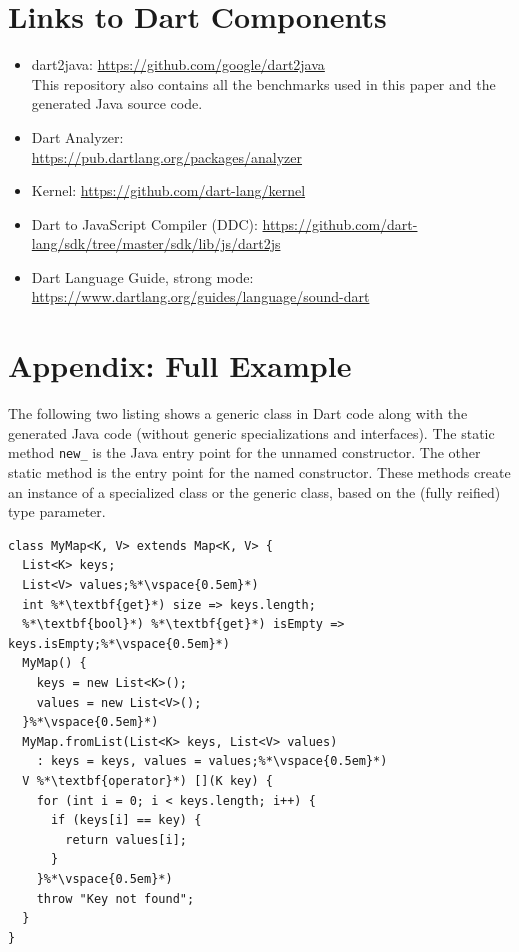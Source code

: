 \documentclass[sigplan]{acmart}
\begin{document}
\section{Links to Dart Components}
\begin{itemize}
  \item dart2java: \url{https://github.com/google/dart2java} \\
    This repository also contains all the benchmarks used in this paper and the generated Java source code.
  \item Dart Analyzer:\\ \url{https://pub.dartlang.org/packages/analyzer}
    \item Kernel: \url{https://github.com/dart-lang/kernel}
    \item Dart to JavaScript Compiler (DDC): \url{https://github.com/dart-lang/sdk/tree/master/sdk/lib/js/dart2js}
    \item Dart Language Guide, strong mode: \\ \url{https://www.dartlang.org/guides/language/sound-dart}
\end{itemize}



\section{Appendix: Full Example}
The following two listing shows a generic class in Dart code along with the generated Java code (without generic specializations and interfaces). The static method \texttt{new\_} is the Java entry point for the unnamed constructor. The other static method is the entry point for the named constructor. These methods create an instance of a specialized class or the generic class, based on the (fully reified) type parameter.

\vfill\eject

\begin{mdframed}[outerlinewidth=0.1pt,outerlinecolor=black,skipabove=4pt,
  innerleftmargin=5pt,innerrightmargin=0pt,innertopmargin=0pt,innerbottommargin=0pt]
\begin{lstlisting}[basicstyle=\scriptsize\ttfamily]
class MyMap<K, V> extends Map<K, V> {
  List<K> keys;
  List<V> values;%*\vspace{0.5em}*)
  int %*\textbf{get}*) size => keys.length;
  %*\textbf{bool}*) %*\textbf{get}*) isEmpty => keys.isEmpty;%*\vspace{0.5em}*)
  MyMap() {
    keys = new List<K>();
    values = new List<V>();
  }%*\vspace{0.5em}*)
  MyMap.fromList(List<K> keys, List<V> values) 
    : keys = keys, values = values;%*\vspace{0.5em}*)
  V %*\textbf{operator}*) [](K key) {
    for (int i = 0; i < keys.length; i++) {
      if (keys[i] == key) {
        return values[i];
      }
    }%*\vspace{0.5em}*)
    throw "Key not found";
  }
}
\end{lstlisting}
\end{mdframed}
\end{document}
